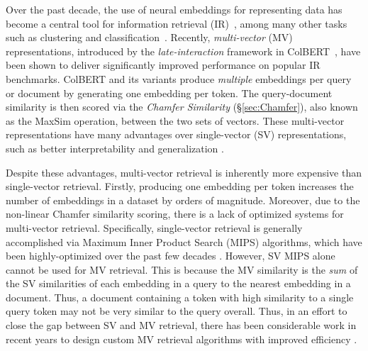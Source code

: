 \documentclass{article}
\begin{document}
Over the past decade, the use of neural embeddings for representing data has become a central tool for information retrieval (IR)~\cite{zhang2016neural}, among many other tasks such as clustering and classification~\cite{muennighoff2022mteb}. 
Recently, \emph{multi-vector} (MV) representations, introduced by the \textit{late-interaction} framework in ColBERT~\cite{khattab2020colbert}, have been shown to deliver significantly improved performance on popular IR benchmarks. ColBERT and its variants \cite{gao2021coil,hofstatter2022introducing,lee2024rethinking,lin2024fine,qian2022multi,santhanam2021colbertv2,wang2021pseudo,yao2021filip} produce \textit{multiple} embeddings per query or document by generating one embedding per token. The query-document similarity is then scored via the \emph{Chamfer Similarity} (§\ref{sec:Chamfer}), also known as the MaxSim operation, between the two sets of vectors. These multi-vector representations have many advantages over single-vector (SV) representations, such as better
interpretability \cite{formal2021white,wang2023reproducibility} and generalization \cite{lupart2023ms,formal2022match,zhan2022evaluating,weller2023nevir}. 



 Despite these advantages, multi-vector retrieval is inherently more expensive than single-vector retrieval. Firstly, producing one embedding per token increases the number of embeddings in a dataset by orders of magnitude.
Moreover, due to the non-linear Chamfer similarity scoring, there is a lack of optimized systems for multi-vector retrieval. 
Specifically, single-vector retrieval is generally accomplished via Maximum Inner Product Search (MIPS) algorithms, which have been highly-optimized over the past few decades \cite{guo2016quantization}. However, SV MIPS alone cannot be used for MV retrieval. This is because the MV similarity is the \emph{sum} of the SV similarities of each embedding in a query to the nearest embedding in a document. Thus, a document containing a token with high similarity to a single query token may not be very similar to the query overall.
Thus, in an effort to close the gap between SV and MV retrieval, there has been considerable work in recent years to design custom MV retrieval algorithms with improved efficiency \cite{santhanam2022plaid, engels2024dessert, hofstatter2022introducing, qian2022multi}.
\end{document}
